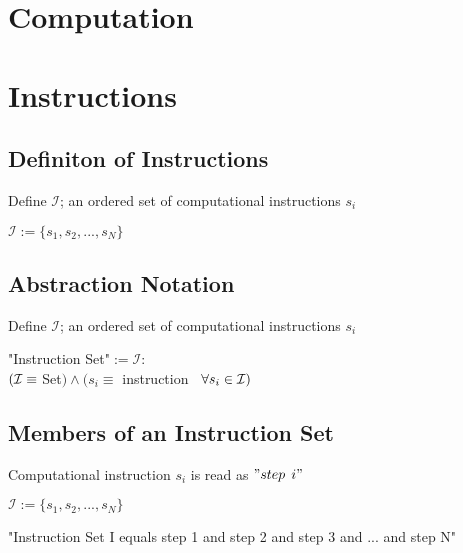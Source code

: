 \documentclass[11pt]{article}
\begin{document}
\section*{Computation}






\section{Instructions}
\subsection{Definiton of Instructions}
Define $\mathcal{I}$; an ordered set of computational instructions $s_i$
\begin{center}
$
\mathcal{I} := \{ s_1,s_2,...,s_{N}\}
$
\end{center}



\subsection{Abstraction Notation}
Define $\mathcal{I}$; an ordered set of computational instructions $s_i$
\begin{center}
"Instruction Set"$ := \mathcal{I}:
$
\\ \vspace{2mm}
$
(\mathcal{I} \equiv \hspace{1mm} $Set$) \land (s_i \equiv$ instruction$ \hspace{3mm} \forall s_i \in \mathcal{I})
$
\end{center}




\subsection{Members of an Instruction Set}
Computational instruction $s_i$ is read as $"step$ $i"$
\begin{center}
$
\mathcal{I} := \{ s_1,s_2,...,s_{N}\}
$
\end{center}
\vspace{1mm}
"Instruction Set I equals step 1 and step 2 and step 3 and ... and step N"
\end{document}
